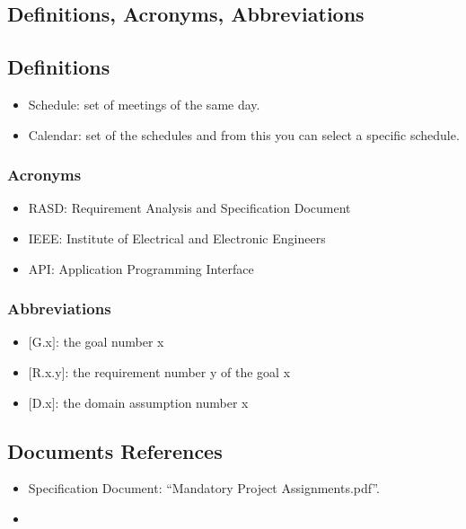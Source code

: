 \subsection{Definitions, Acronyms, Abbreviations}

\subsection{Definitions}
\renewcommand{\labelitemi}{$-$}
\begin{itemize}
\item
Schedule: set of meetings of the same day.
\item
Calendar: set of the schedules and from this you can select a specific schedule.
\end{itemize}


\subsubsection{Acronyms}
\renewcommand{\labelitemi}{$-$}
\begin{itemize}
\item
RASD: Requirement Analysis and Specification Document
\item
IEEE: Institute of Electrical and Electronic Engineers
\item
API: Application Programming Interface
\end{itemize}

\subsubsection{Abbreviations}
\renewcommand{\labelitemi}{$-$}
\begin{itemize}
\item
$[$G.x$]$: the goal number x
\item
$[$R.x.y$]$: the requirement number y of the goal x
\item
$[$D.x$]$: the domain assumption number x
\end{itemize}

\subsection{Documents References}
\renewcommand{\labelitemi}{$-$}
\begin{itemize}
\item
Specification Document: “Mandatory Project Assignments.pdf”.
\item
\href{http://ieeexplore.ieee.org/servlet/opac?punumber=6146377}{\color{Black}{IEEE Std 29148-2011 - ISO/IEC/IEEE International Standard - Systems and software engineering}}
\end{itemize}